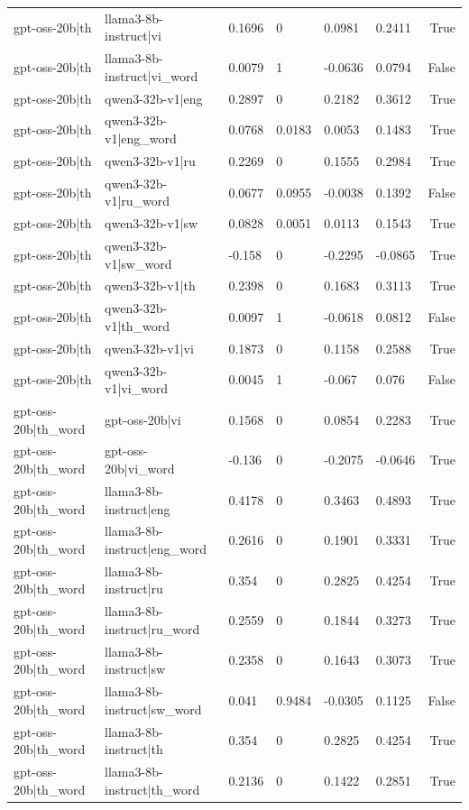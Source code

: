 \begin{table}
\begin{tabular}{llllllr}
gpt-oss-20b|th & llama3-8b-instruct|vi & 0.1696 & 0 & 0.0981 & 0.2411 & True \\
gpt-oss-20b|th & llama3-8b-instruct|vi_word & 0.0079 & 1 & -0.0636 & 0.0794 & False \\
gpt-oss-20b|th & qwen3-32b-v1|eng & 0.2897 & 0 & 0.2182 & 0.3612 & True \\
gpt-oss-20b|th & qwen3-32b-v1|eng_word & 0.0768 & 0.0183 & 0.0053 & 0.1483 & True \\
gpt-oss-20b|th & qwen3-32b-v1|ru & 0.2269 & 0 & 0.1555 & 0.2984 & True \\
gpt-oss-20b|th & qwen3-32b-v1|ru_word & 0.0677 & 0.0955 & -0.0038 & 0.1392 & False \\
gpt-oss-20b|th & qwen3-32b-v1|sw & 0.0828 & 0.0051 & 0.0113 & 0.1543 & True \\
gpt-oss-20b|th & qwen3-32b-v1|sw_word & -0.158 & 0 & -0.2295 & -0.0865 & True \\
gpt-oss-20b|th & qwen3-32b-v1|th & 0.2398 & 0 & 0.1683 & 0.3113 & True \\
gpt-oss-20b|th & qwen3-32b-v1|th_word & 0.0097 & 1 & -0.0618 & 0.0812 & False \\
gpt-oss-20b|th & qwen3-32b-v1|vi & 0.1873 & 0 & 0.1158 & 0.2588 & True \\
gpt-oss-20b|th & qwen3-32b-v1|vi_word & 0.0045 & 1 & -0.067 & 0.076 & False \\
gpt-oss-20b|th_word & gpt-oss-20b|vi & 0.1568 & 0 & 0.0854 & 0.2283 & True \\
gpt-oss-20b|th_word & gpt-oss-20b|vi_word & -0.136 & 0 & -0.2075 & -0.0646 & True \\
gpt-oss-20b|th_word & llama3-8b-instruct|eng & 0.4178 & 0 & 0.3463 & 0.4893 & True \\
gpt-oss-20b|th_word & llama3-8b-instruct|eng_word & 0.2616 & 0 & 0.1901 & 0.3331 & True \\
gpt-oss-20b|th_word & llama3-8b-instruct|ru & 0.354 & 0 & 0.2825 & 0.4254 & True \\
gpt-oss-20b|th_word & llama3-8b-instruct|ru_word & 0.2559 & 0 & 0.1844 & 0.3273 & True \\
gpt-oss-20b|th_word & llama3-8b-instruct|sw & 0.2358 & 0 & 0.1643 & 0.3073 & True \\
gpt-oss-20b|th_word & llama3-8b-instruct|sw_word & 0.041 & 0.9484 & -0.0305 & 0.1125 & False \\
gpt-oss-20b|th_word & llama3-8b-instruct|th & 0.354 & 0 & 0.2825 & 0.4254 & True \\
gpt-oss-20b|th_word & llama3-8b-instruct|th_word & 0.2136 & 0 & 0.1422 & 0.2851 & True \\

\end{tabular}
\end{table}
